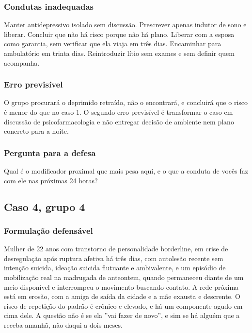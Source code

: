 \subsubsection*{Condutas inadequadas}

Manter antidepressivo isolado sem discussão. Prescrever apenas indutor de sono e liberar. Concluir que não há risco porque não há plano. Liberar com a esposa como garantia, sem verificar que ela viaja em três dias. Encaminhar para ambulatório em trinta dias. Reintroduzir lítio sem exames e sem definir quem acompanha.

\subsubsection*{Erro previsível}

O grupo procurará o deprimido retraído, não o encontrará, e concluirá que o risco é menor do que no caso 1. O segundo erro previsível é transformar o caso em discussão de psicofarmacologia e não entregar decisão de ambiente nem plano concreto para a noite.

\subsubsection*{Pergunta para a defesa}

Qual é o modificador proximal que mais pesa aqui, e o que a conduta de vocês faz com ele nas próximas 24 horas?

\filete

\subsection*{Caso 4, grupo 4}

\subsubsection*{Formulação defensável}

Mulher de 22 anos com transtorno de personalidade borderline, em crise de desregulação após ruptura afetiva há três dias, com autolesão recente sem intenção suicida, ideação suicida flutuante e ambivalente, e um episódio de mobilização real na madrugada de anteontem, quando permaneceu diante de um meio disponível e interrompeu o movimento buscando contato. A rede próxima está em erosão, com a amiga de saída da cidade e a mãe exausta e descrente. O risco de repetição do padrão é crônico e elevado, e há um componente agudo em cima dele. A questão não é se ela ''vai fazer de novo'', e sim se há alguém que a receba amanhã, não daqui a dois meses.

